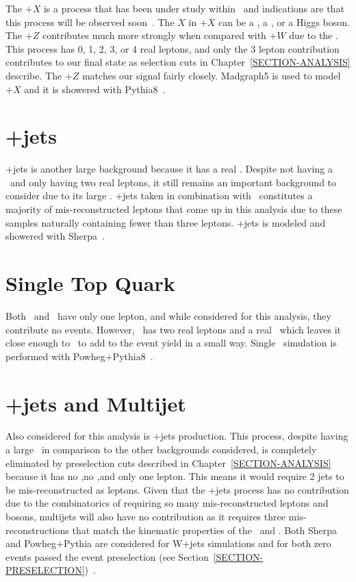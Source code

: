 The \TTB$+X$ is a process that has been under study within \atlas~and indications are that this process will be observed soon~\cite{ATLAS-CONF-2016-003}. The $X$ in \TTB$+X$ can be a \az, a \aw, or a Higgs boson. The \TTB$+Z$ contributes much more strongly when compared with \TTB$+W$ due to the \az. This process has 0, 1, 2, 3, or 4 real leptons, and only the 3 lepton contribution contributes to our final state as selection cuts in Chapter~\ref{SECTION-ANALYSIS} describe. The \TTB$+Z$ matches our signal fairly closely. Madgraph5 is used to model \TTB$+X$ and it is showered with Pythia8~\cite{MADGRAPH,PYTHIA}. 

\section{\az +jets}
\label{SECTION-MC-BG-Z+jets}

\az+jets is another large background because it has a real \az. Despite not having a \at~and only having two real leptons, it still remains an important background to consider due to its large \xs. \az+jets taken in combination with \TTB~constitutes a majority of mis-reconstructed leptons that come up in this analysis due to these samples naturally containing fewer than three leptons. \az+jets is modeled and showered with Sherpa~\cite{Sherpa}. 

\section{Single Top Quark}
\label{SECTION-MC-BG-sgtop}

Both \tchan~and \schan~have only one lepton, and while considered for this analysis, they contribute no events. However, \Wt~has two real leptons and a real \at~which leaves it close enough to \tz~to add to the event yield in a small way. Single \athyph~simulation is performed with Powheg+Pythia8~\cite{POWHEG,PYTHIA}. 

\section{\aw +jets and Multijet}
\label{SECTION-MC-BG-W+jets}

Also considered for this analysis is \aw +jets production. This process, despite having a large \xs~in comparison to the other backgrounds considered, is completely eliminated by preselection cuts described in Chapter~\ref{SECTION-ANALYSIS} because it has no \az,no \at,and only one lepton. This means it would require 2 jets to be mis-reconstructed as leptons. Given that the \aw+jets process has no contribution due to the combinatorics of requiring so many mis-reconstructed leptons and bosons, multijets will also have no contribution as it requires three mis-reconstructions that match the kinematic properties of the \aw~and \az. Both Sherpa and Powheg+Pythia are considered for W+jets simulations and for both zero events passed the event preselection (see Section~\ref{SECTION-PRESELECTION})~\cite{Sherpa,POWHEG,PYTHIA}. 

